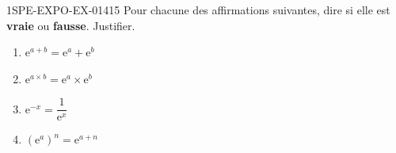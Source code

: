 \begin{exercice}{1SPE-EXPO-EX-014}{1}{5}
Pour chacune des affirmations suivantes, dire si elle est \textbf{vraie} ou \textbf{fausse}. Justifier.
\begin{enumerate}
  \item $\mathrm{e}^{a+b} = \mathrm{e}^a + \mathrm{e}^b$
  \item $\mathrm{e}^{a \times b} = \mathrm{e}^a \times \mathrm{e}^b$
  \item $\mathrm{e}^{-x} = \dfrac{1}{\mathrm{e}^x}$
  \item $\left(\mathrm{e}^a\right)^n = \mathrm{e}^{a+n}$
\end{enumerate}
\end{exercice}
